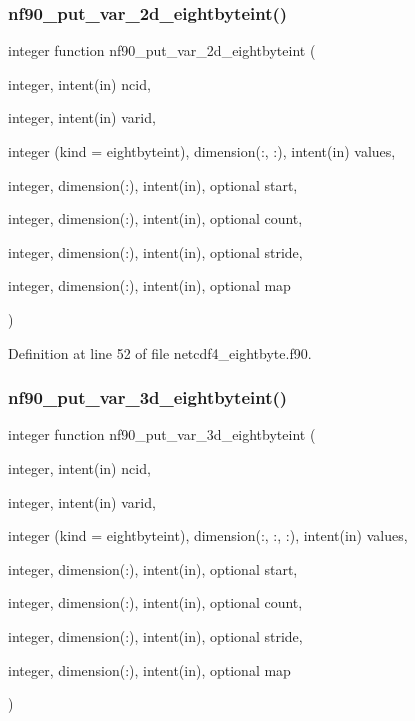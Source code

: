 \subsubsection{\texorpdfstring{nf90\+\_\+put\+\_\+var\+\_\+2d\+\_\+eightbyteint()}{nf90\_put\_var\_2d\_eightbyteint()}}
{\footnotesize\ttfamily integer function nf90\+\_\+put\+\_\+var\+\_\+2d\+\_\+eightbyteint (\begin{DoxyParamCaption}\item[{integer, intent(in)}]{ncid,  }\item[{integer, intent(in)}]{varid,  }\item[{integer (kind = eightbyteint), dimension(\+:, \+:), intent(in)}]{values,  }\item[{integer, dimension(\+:), intent(in), optional}]{start,  }\item[{integer, dimension(\+:), intent(in), optional}]{count,  }\item[{integer, dimension(\+:), intent(in), optional}]{stride,  }\item[{integer, dimension(\+:), intent(in), optional}]{map }\end{DoxyParamCaption})}



Definition at line 52 of file netcdf4\+\_\+eightbyte.\+f90.

\mbox{\label{netcdf4__eightbyte_8f90_a8cc31a27809898ae558570386d71fd3c}} 
\subsubsection{\texorpdfstring{nf90\+\_\+put\+\_\+var\+\_\+3d\+\_\+eightbyteint()}{nf90\_put\_var\_3d\_eightbyteint()}}
{\footnotesize\ttfamily integer function nf90\+\_\+put\+\_\+var\+\_\+3d\+\_\+eightbyteint (\begin{DoxyParamCaption}\item[{integer, intent(in)}]{ncid,  }\item[{integer, intent(in)}]{varid,  }\item[{integer (kind = eightbyteint), dimension(\+:, \+:, \+:), intent(in)}]{values,  }\item[{integer, dimension(\+:), intent(in), optional}]{start,  }\item[{integer, dimension(\+:), intent(in), optional}]{count,  }\item[{integer, dimension(\+:), intent(in), optional}]{stride,  }\item[{integer, dimension(\+:), intent(in), optional}]{map }\end{DoxyParamCaption})}



